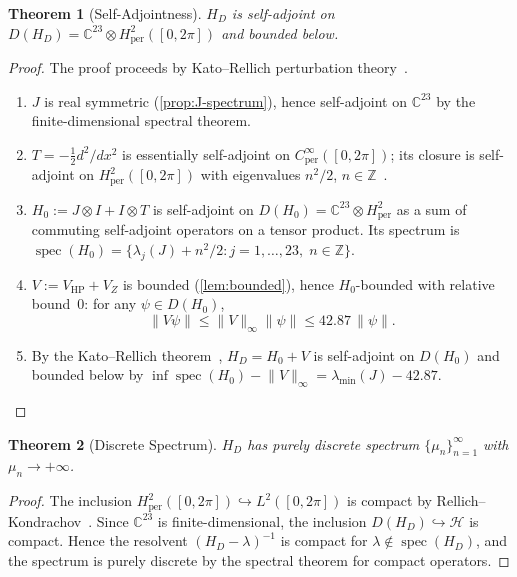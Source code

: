\documentclass[11pt,a4paper]{article}
\theoremstyle{plain}
\newtheorem{theorem}{Theorem}[section]
\theoremstyle{remark}
\newcommand{\Z}{\mathbb{Z}}
\newcommand{\C}{\mathbb{C}}
\newcommand{\HH}{\mathcal{H}}
\newcommand{\norm}[1]{\lVert #1 \rVert}
\newcommand{\spec}{\operatorname{spec}}
\begin{document}
\begin{theorem}[Self-Adjointness]\label{thm:self-adjoint}
$H_D$ is self-adjoint on $D(H_D)=\C^{23}\otimes H^2_{\mathrm{per}}([0,2\pi])$
and bounded below.
\end{theorem}

\begin{proof}
The proof proceeds by Kato--Rellich perturbation theory~\cite{kato1995,reed-simon1978}.
\begin{enumerate}[nosep]
  \item $J$ is real symmetric (\cref{prop:J-spectrum}), hence self-adjoint
        on $\C^{23}$ by the finite-dimensional spectral theorem.
  \item $T=-\tfrac{1}{2}d^2/dx^2$ is essentially self-adjoint on
        $C^\infty_{\mathrm{per}}([0,2\pi])$; its closure is self-adjoint on
        $H^2_{\mathrm{per}}([0,2\pi])$ with eigenvalues $n^2/2$,
        $n\in\Z$~\cite{reed-simon1975}.
  \item $H_0 := J\otimes I + I\otimes T$ is self-adjoint on
        $D(H_0)=\C^{23}\otimes H^2_{\mathrm{per}}$ as a sum of commuting
        self-adjoint operators on a tensor product.  Its spectrum is
        $\spec(H_0)=\{\lambda_j(J)+n^2/2 : j=1,\ldots,23,\; n\in\Z\}$.
  \item $V := V_{\mathrm{HP}}+V_Z$ is bounded (\cref{lem:bounded}), hence
        $H_0$-bounded with relative bound~$0$: for any $\psi\in D(H_0)$,
        \[
          \norm{V\psi} \leq \norm{V}_\infty\norm{\psi}
          \leq 42.87\,\norm{\psi}.
        \]
  \item By the Kato--Rellich theorem~\cite{kato1995}, $H_D = H_0 + V$ is
        self-adjoint on $D(H_0)$ and bounded below by
        $\inf\spec(H_0)-\norm{V}_\infty
        = \lambda_{\min}(J)-42.87$.
        \qedhere
\end{enumerate}
\end{proof}

\begin{theorem}[Discrete Spectrum]\label{thm:discrete}
$H_D$ has purely discrete spectrum $\{\mu_n\}_{n=1}^\infty$ with
$\mu_n\to+\infty$.
\end{theorem}

\begin{proof}
The inclusion $H^2_{\mathrm{per}}([0,2\pi])\hookrightarrow L^2([0,2\pi])$
is compact by Rellich--Kondrachov~\cite{adams-fournier2003}.  Since
$\C^{23}$ is finite-dimensional, the inclusion
$D(H_D)\hookrightarrow\HH$ is compact.  Hence the resolvent
$(H_D-\lambda)^{-1}$ is compact for $\lambda\notin\spec(H_D)$,
and the spectrum is purely discrete by the spectral theorem for
compact operators.
\end{proof}
\end{document}
